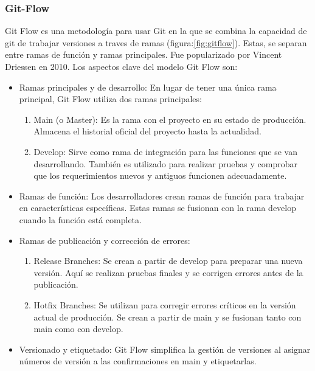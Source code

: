 \subsubsection{Git-Flow}
Git Flow es una metodología para usar Git en la que se combina la capacidad de git de trabajar versiones a traves de ramas (figura:\ref{fig:gitflow}). Estas, se separan entre ramas de función y ramas principales. Fue popularizado por Vincent Driessen en 2010. Los aspectos clave del modelo Git Flow son:
\begin{itemize}
\item Ramas principales y de desarrollo: En lugar de tener una única rama principal, Git Flow utiliza dos ramas principales:
\begin{enumerate}
\item Main (o Master): Es la rama con el proyecto en su estado de producción. Almacena el historial oficial del proyecto hasta la actualidad.
\item Develop: Sirve como rama de integración para las funciones que se van desarrollando. También es utilizado para realizar pruebas y comprobar que los requerimientos nuevos y antiguos funcionen adecuadamente.
\end{enumerate}
\item Ramas de función: Los desarrolladores crean ramas de función para trabajar en características específicas. Estas ramas se fusionan con la rama develop cuando la función está completa.
\item Ramas de publicación y corrección de errores:
\begin{enumerate}
\item Release Branches: Se crean a partir de develop para preparar una nueva versión. Aquí se realizan pruebas finales y se corrigen errores antes de la publicación.
\item Hotfix Branches: Se utilizan para corregir errores críticos en la versión actual de producción. Se crean a partir de main y se fusionan tanto con main como con develop.
\end{enumerate}
\item Versionado y etiquetado: Git Flow simplifica la gestión de versiones al asignar números de versión a las confirmaciones en main y etiquetarlas.
\end{itemize}

